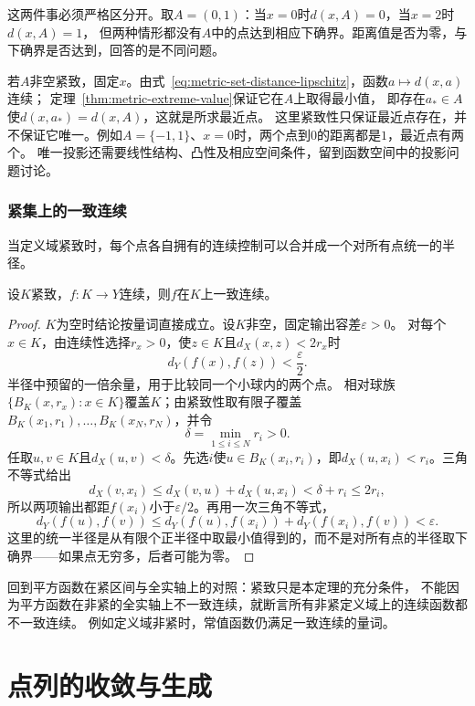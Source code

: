 这两件事必须严格区分开。取$A=(0,1)$：当$x=0$时$d(x,A)=0$，当$x=2$时$d(x,A)=1$，
但两种情形都没有$A$中的点达到相应下确界。距离值是否为零，与下确界是否达到，回答的是不同问题。

若$A$非空紧致，固定$x$。由式~\eqref{eq:metric-set-distance-lipschitz}，函数$a\mapsto d(x,a)$连续；
定理~\ref{thm:metric-extreme-value}保证它在$A$上取得最小值，
即存在$a_*\in A$使$d(x,a_*)=d(x,A)$，这就是所求最近点。
这里紧致性只保证最近点存在，并不保证它唯一。例如$A=\{-1,1\}$、$x=0$时，两个点到$0$的距离都是$1$，最近点有两个。
唯一投影还需要线性结构、凸性及相应空间条件，留到函数空间中的投影问题讨论。

\subsubsection{紧集上的一致连续}
\label{sec:metric-compact-uniform-continuity}

当定义域紧致时，每个点各自拥有的连续控制可以合并成一个对所有点统一的半径。

\begin{theorem}
\label{thm:metric-heine-cantor}
设$K$紧致，$f:K\to Y$连续，则$f$在$K$上一致连续。
\end{theorem}

\begin{proof}
$K$为空时结论按量词直接成立。设$K$非空，固定输出容差$\varepsilon>0$。
对每个$x\in K$，由连续性选择$r_x>0$，使$z\in K$且$d_X(x,z)<2r_x$时
\[
  d_Y(f(x),f(z))<\frac{\varepsilon}{2}.
\]
半径中预留的一倍余量，用于比较同一个小球内的两个点。
相对球族$\{B_K(x,r_x):x\in K\}$覆盖$K$；由紧致性取有限子覆盖
$B_K(x_1,r_1),\ldots,B_K(x_N,r_N)$，并令
\[
  \delta=\min_{1\leq i\leq N}r_i>0.
\]
任取$u,v\in K$且$d_X(u,v)<\delta$。先选$i$使$u\in B_K(x_i,r_i)$，即$d_X(u,x_i)<r_i$。三角不等式给出
\[
  d_X(v,x_i)\leq d_X(v,u)+d_X(u,x_i)<\delta+r_i\leq2r_i,
\]
所以两项输出都距$f(x_i)$小于$\varepsilon/2$。再用一次三角不等式，
\[
  d_Y(f(u),f(v))
  \leq d_Y(f(u),f(x_i))+d_Y(f(x_i),f(v))<\varepsilon.
\]
这里的统一半径是从有限个正半径中取最小值得到的，而不是对所有点的半径取下确界——如果点无穷多，后者可能为零。
\end{proof}

回到平方函数在紧区间与全实轴上的对照：紧致只是本定理的充分条件，
不能因为平方函数在非紧的全实轴上不一致连续，就断言所有非紧定义域上的连续函数都不一致连续。
例如定义域非紧时，常值函数仍满足一致连续的量词。

\section{点列的收敛与生成}
\label{sec:metric-sequence-limits}

